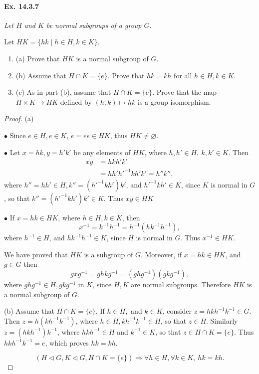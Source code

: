 \documentclass[11pt,a4paper]{article}
\newcommand{\be} {\begin{enumerate}}
\newcommand{\ee} {\end{enumerate}}
\begin{document}
\paragraph{Ex. 14.3.7}{\it Let $H$ and $K$ be normal subgroups of a group $G$. 

Let $HK =\{hk \mid h \in H, k \in K\}$.
\be
\item[(a)] Prove that $HK$ is a normal subgroup of $G$.
\item[(b)] Assume that $H \cap K = \{e\}$. Prove that $hk = kh$ for all $h\in H, k \in K$.
\item[(c)] As in part (b), assume that $H\cap K = \{e\}$. Prove that the map $H \times K \to HK$ defined by $(h,k) \mapsto hk$ is a group isomorphism.
\ee
}
\begin{proof}
\item[(a)] 

  \item[$\bullet$] Since $e\in H, e \in K$, $e = e e \in HK$, thus $HK \ne \varnothing$.
  \item[$\bullet$] Let $x = hk, y = h'k'$ be any elements of $HK$, where $h,h' \in H,\ k,k'\in K$. Then
  \begin{align*}
  xy &= hkh'k'\\
  &= hh' h'^{-1}kh' k' = h''k'',
  \end{align*}
  where $h''= hh'\in H, k'' = (h'^{-1}kh' )k' $, and $h'^{-1}kh' \in K$, since $K$ is normal in $G$, so that $k'' =  (h'^{-1}kh' )k' \in K$. Thus $xy \in HK$
  \item[$\bullet$] If $x = hk \in HK$, where $h \in H, k \in K$, then
  $$x^{-1} = k^{-1}h^{-1} = h^{-1}(h k^{-1} h^{-1}),$$
  where $h^{-1} \in H$, and $h k^{-1} h^{-1} \in K$, since $H$ is normal in $G$. Thus $x^{-1} \in HK$.
  
  We have proved that $HK$ is a subgroup of $G$. Moreover, if $x = hk \in HK$, and $g \in G$ then
  $$gx g^{-1} = ghk g^{-1} = (ghg^{-1})(gkg^{-1}),$$
  where $ghg^{-1} \in H, gkg^{-1}$ in $K$, since $H,K$ are normal subgroups. Therefore $HK$ is a normal subgroup of $G$.

\item[(b)] Assume that $H \cap K = \{e\}$. If $h \in H,$ and $k \in K$, consider $z = hkh^{-1}k^{-1} \in G$. Then $z = h(kh^{-1}k^{-1})$, where $h \in H, k h^{-1} k^{-1} \in H$, so that $z \in H$. Similarly $z = (hkh^{-1}) k^{-1}$, where $hkh^{-1} \in H$ and $k^{-1} \in K$, so that $z \in H \cap K = \{e\}$. Thus $hkh^{-1}k^{-1} = e$, which proves $hk = kh$.

$$(H \lhd G, K \lhd G, H \cap K = \{e\} ) \Rightarrow \forall h\in H, \forall k \in K, \ hk = kh.$$


\end{proof}
\end{document}

